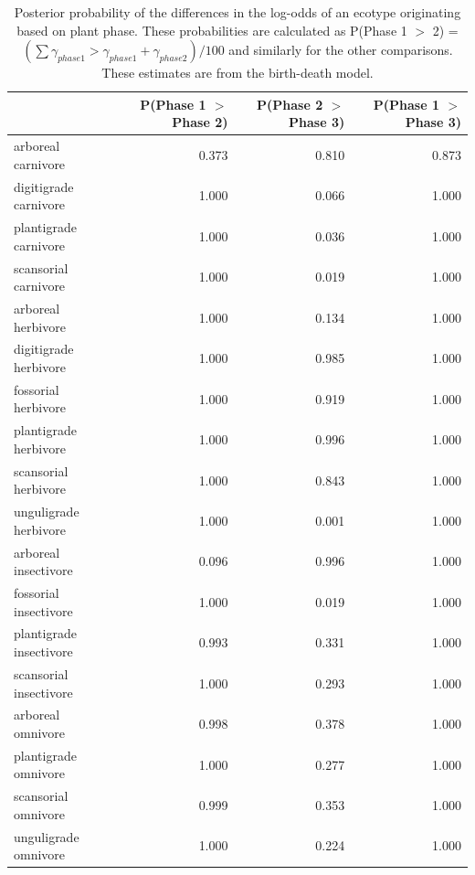 \documentclass[12pt,letterpaper]{article}
\begin{document}
\begin{table}[ht]
  \centering
  \caption[Posterior probablity estimates of differences in origination by plant phase]{Posterior probability of the differences in the log-odds of an ecotype originating based on plant phase. These probabilities are calculated as P(Phase 1 \(>\) 2) = \( (\sum \gamma_{phase 1} > \gamma_{phase 1} + \gamma_{phase 2}) / 100\) and similarly for the other comparisons. These estimates are from the birth-death model.}
  \label{tab:origin_plant}
  \begin{tabular}{ l r r r }
    \hline
    & P(Phase 1 $>$ Phase 2) & P(Phase 2 $>$ Phase 3) & P(Phase 1 $>$ Phase 3) \\ 
    \hline
arboreal carnivore & 0.373 & 0.810 & 0.873 \\ 
  digitigrade carnivore & 1.000 & 0.066 & 1.000 \\ 
  plantigrade carnivore & 1.000 & 0.036 & 1.000 \\ 
  scansorial carnivore & 1.000 & 0.019 & 1.000 \\ 
  arboreal herbivore & 1.000 & 0.134 & 1.000 \\ 
  digitigrade herbivore & 1.000 & 0.985 & 1.000 \\ 
  fossorial herbivore & 1.000 & 0.919 & 1.000 \\ 
  plantigrade herbivore & 1.000 & 0.996 & 1.000 \\ 
  scansorial herbivore & 1.000 & 0.843 & 1.000 \\ 
  unguligrade herbivore & 1.000 & 0.001 & 1.000 \\ 
  arboreal insectivore & 0.096 & 0.996 & 1.000 \\ 
  fossorial insectivore & 1.000 & 0.019 & 1.000 \\ 
  plantigrade insectivore & 0.993 & 0.331 & 1.000 \\ 
  scansorial insectivore & 1.000 & 0.293 & 1.000 \\ 
  arboreal omnivore & 0.998 & 0.378 & 1.000 \\ 
  plantigrade omnivore & 1.000 & 0.277 & 1.000 \\ 
  scansorial omnivore & 0.999 & 0.353 & 1.000 \\ 
  unguligrade omnivore & 1.000 & 0.224 & 1.000 \\ 
    \hline
  \end{tabular}
\end{table}
\end{document}
